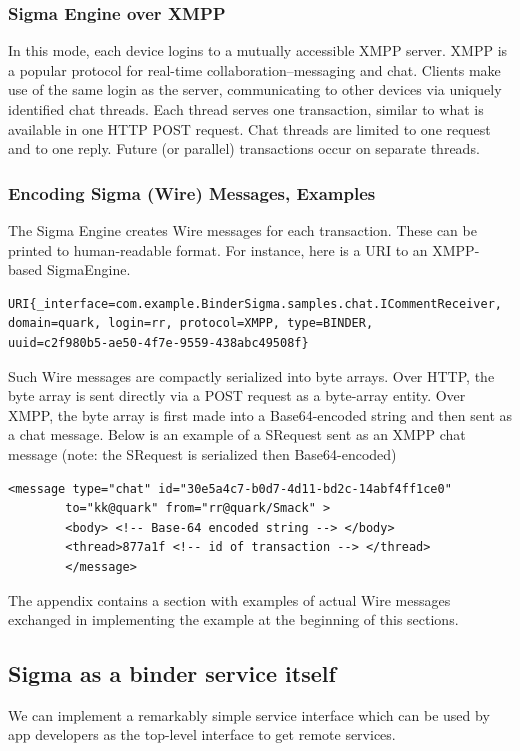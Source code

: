 \documentclass[prodmode]{acmlarge}
\begin{document}
\subsubsection{Sigma Engine over XMPP}
In this mode, each device logins to a mutually accessible XMPP server. XMPP is a popular protocol for real-time collaboration--messaging and chat. Clients make use of the same login as the server, communicating to other devices via uniquely identified chat threads. Each thread serves one transaction, similar to what is available in one HTTP POST request. Chat threads are limited to one request and to one reply. Future (or parallel) transactions occur on separate threads.

\subsubsection{Encoding Sigma (Wire) Messages, Examples}
The Sigma Engine creates Wire messages for each transaction. These can be printed to human-readable format. For instance, here is a URI to an XMPP-based SigmaEngine.
\begin{Verbatim}[samepage=true]
URI{_interface=com.example.BinderSigma.samples.chat.ICommentReceiver,
domain=quark, login=rr, protocol=XMPP, type=BINDER,
uuid=c2f980b5-ae50-4f7e-9559-438abc49508f}
\end{Verbatim}

Such Wire messages are compactly serialized into byte arrays. Over HTTP, the byte array is sent directly via a POST request as a byte-array entity. Over XMPP, the byte array is first made into a Base64-encoded string and then sent as a chat message. Below is an example of a SRequest sent as an XMPP chat message (note: the SRequest is serialized then Base64-encoded)
\begin{Verbatim}[samepage=true]
<message type="chat" id="30e5a4c7-b0d7-4d11-bd2c-14abf4ff1ce0"
        to="kk@quark" from="rr@quark/Smack" >
        <body> <!-- Base-64 encoded string --> </body>
        <thread>877a1f <!-- id of transaction --> </thread>
        </message>
\end{Verbatim}

The appendix contains a section with examples of actual Wire messages exchanged in implementing the example at the beginning of this sections.

\subsection{Sigma as a binder service itself}
We can implement a remarkably simple service interface which can be used by app developers as the top-level interface to get remote services.
\end{document}
